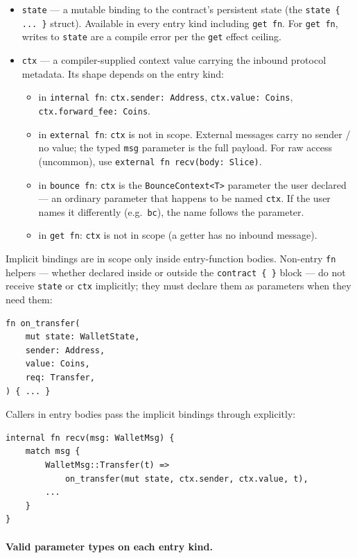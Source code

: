 \documentclass[12pt,oneside]{article}
\begin{document}
\begin{itemize}
\item \verb|state| --- a mutable binding to the contract's persistent
state (the \verb|state { ... }| struct). Available in every entry
kind including \verb|get fn|. For \verb|get fn|, writes to
\verb|state| are a compile error per the \verb|get| effect ceiling.
\item \verb|ctx| --- a compiler-supplied context value carrying the
inbound protocol metadata. Its shape depends on the entry kind:
\begin{itemize}
\item in \verb|internal fn|: \verb|ctx.sender: Address|,
\verb|ctx.value: Coins|, \verb|ctx.forward_fee: Coins|.
\item in \verb|external fn|: \verb|ctx| is not in scope. External
messages carry no sender / no value; the typed \verb|msg|
parameter is the full payload. For raw access (uncommon), use
\verb|external fn recv(body: Slice)|.
\item in \verb|bounce fn|: \verb|ctx| is the \verb|BounceContext<T>|
parameter the user declared --- an ordinary parameter that
happens to be named \verb|ctx|. If the user names it differently
(e.g.\ \verb|bc|), the name follows the parameter.
\item in \verb|get fn|: \verb|ctx| is not in scope (a getter has no
inbound message).
\end{itemize}
\end{itemize}

Implicit bindings are in scope only inside entry-function bodies.
Non-entry \verb|fn| helpers --- whether declared inside or outside the
\verb|contract { }| block --- do not receive \verb|state| or
\verb|ctx| implicitly; they must declare them as parameters when they
need them:

\begin{verbatim}
fn on_transfer(
    mut state: WalletState,
    sender: Address,
    value: Coins,
    req: Transfer,
) { ... }
\end{verbatim}

Callers in entry bodies pass the implicit bindings through explicitly:

\begin{verbatim}
internal fn recv(msg: WalletMsg) {
    match msg {
        WalletMsg::Transfer(t) =>
            on_transfer(mut state, ctx.sender, ctx.value, t),
        ...
    }
}
\end{verbatim}

\paragraph{Valid parameter types on each entry kind.}
\end{document}

